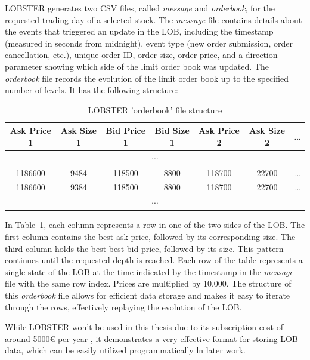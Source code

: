 \documentclass[a4paper,oneside,onecolumn,12pt]{book}
\begin{document}
	LOBSTER generates two CSV files, called \textit{message} and \textit{orderbook}, for the requested trading day of a selected stock. The \textit{message} file contains details about the events that triggered an update in the LOB, including the timestamp (measured in seconds from midnight), event type (new order submission, order cancellation, etc.), unique order ID, order size, order price, and a direction parameter showing which side of the limit order book was updated. The \textit{orderbook} file records the evolution of the limit order book up to the specified number of levels. It has the following structure: 
	\begin{table}[H]
		\begin{center}
		\begin{tabular}{|c|c|c|c|c|c|c|}
			\hline
			\textbf{Ask Price 1} & \textbf{Ask Size 1} & \textbf{Bid Price 1} & \textbf{Bid Size 1} & \textbf{Ask Price 2} & \textbf{Ask Size 2} & \textbf{\dots} \\
			\hline
			\multicolumn{7}{|c|}{$\cdots$} \\
			\hline
			1186600 & 9484  & 118500 & 8800  & 118700  & 22700  & \dots \\ 
			\hline
			1186600 & 9384  & 118500 & 8800  & 118700  & 22700  & \dots \\ 
			\hline
			\multicolumn{7}{|c|}{$\cdots$} \\
			\hline
		\end{tabular}
		\end{center}
		\caption{LOBSTER 'orderbook' file structure}
		\label{table:lobster}
	\end{table}
	In Table~\ref{table:lobster}, each column represents a row in one of the two sides of the LOB. The first column contains the best ask price, followed by its corresponding size. The third column holds the best best bid price, followed by its size. This pattern continues until the requested depth is reached. Each row of the table represents a single state of the LOB at the time indicated by the timestamp in the \textit{message} file with the same row index. Prices are multiplied by 10,000. The structure of this \textit{orderbook} file allows for efficient data storage and makes it easy to iterate through the rows, effectively replaying the evolution of the LOB. \cite{LOBSTERDS}

	While LOBSTER won't be used in this thesis due to its subscription cost of around 5000€ per year \cite{LOBSTERAO}, it demonstrates a very effective format for storing LOB data, which can be easily utilized programmatically ln later work.
\end{document}
